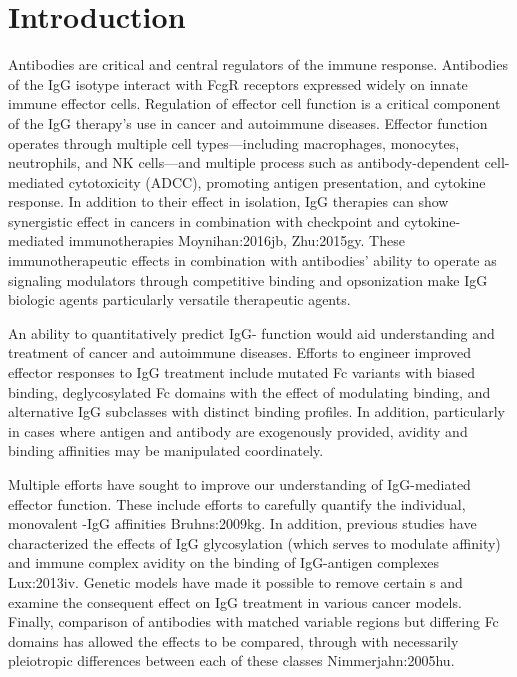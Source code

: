 \section{Introduction}

Antibodies are critical and central regulators of the immune response. Antibodies of the IgG isotype interact with FcgR receptors expressed widely on innate immune effector cells. Regulation of effector cell function is a critical component of the IgG therapy's use in cancer and autoimmune diseases. Effector function operates through multiple cell types---including macrophages, monocytes, neutrophils, and NK cells---and multiple process such as antibody-dependent cell-mediated cytotoxicity (ADCC), promoting antigen presentation, and cytokine response. In addition to their effect in isolation, IgG therapies can show synergistic effect in cancers in combination with checkpoint and cytokine-mediated immunotherapies \ac{Moynihan:2016jb, Zhu:2015gy}. These immunotherapeutic effects in combination with antibodies' ability to operate as signaling modulators through competitive binding and opsonization make IgG biologic agents particularly versatile therapeutic agents.

An ability to quantitatively predict IgG-\fcgr{} function would aid understanding and treatment of cancer and autoimmune diseases. Efforts to engineer improved effector responses to IgG treatment include mutated Fc variants with biased \fcgr{} binding, deglycosylated Fc domains with the effect of modulating \fcgr{} binding, and alternative IgG subclasses with distinct binding profiles. In addition, particularly in cases where antigen and antibody are exogenously provided, avidity and binding affinities may be manipulated coordinately. %

Multiple efforts have sought to improve our understanding of IgG-mediated effector function. These include efforts to carefully quantify the individual, monovalent \fcgr{}-IgG affinities \ac{Bruhns:2009kg}. In addition, previous studies have characterized the effects of IgG glycosylation (which serves to modulate \fcgr{} affinity) and immune complex avidity on the binding of IgG-antigen complexes \ac{Lux:2013iv}. Genetic models have made it possible to remove certain \fcgr{}s and examine the consequent effect on IgG treatment in various cancer models. Finally, comparison of antibodies with matched variable regions but differing Fc domains has allowed the effects to be compared, through with necessarily pleiotropic differences between each of these classes \ac{Nimmerjahn:2005hu}.

